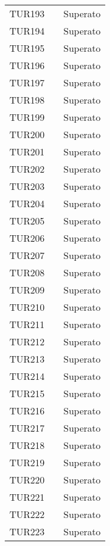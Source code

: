 \documentclass[PianoDiQualifica.tex]{subfiles}
\begin{document}
\begin{longtable}[H]{P{2cm}P{8.5cm}P{3cm}}
	TUR193 & & Superato \\
	TUR194 & & Superato \\
	TUR195 & & Superato \\
	TUR196 & & Superato \\
	TUR197 & & Superato \\
	TUR198 & & Superato \\
	TUR199 & & Superato \\
	TUR200 & & Superato \\
	TUR201 & & Superato \\
	TUR202 & & Superato \\
	TUR203 & & Superato \\
	TUR204 & & Superato \\
	TUR205 & & Superato \\
	TUR206 & & Superato \\
	TUR207 & & Superato \\
	TUR208 & & Superato \\
	TUR209 & & Superato \\
	TUR210 & & Superato \\
	TUR211 & & Superato \\
	TUR212 & & Superato \\
	TUR213 & & Superato \\
	TUR214 & & Superato \\
	TUR215 & & Superato \\
	TUR216 & & Superato \\
	TUR217 & & Superato \\
	TUR218 & & Superato \\
	TUR219 & & Superato \\
	TUR220 & & Superato \\
	TUR221 & & Superato \\
	TUR222 & & Superato \\
	TUR223 & & Superato \\


\end{longtable}
\end{document}
